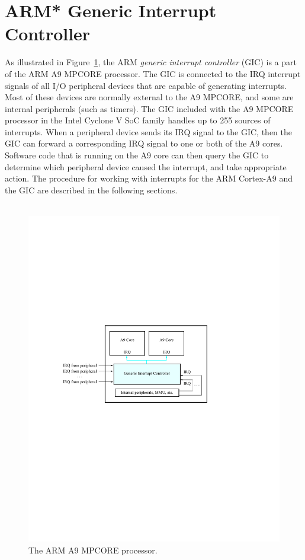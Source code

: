 \documentclass[11pt, twoside, pdftex]{article}
\begin{document}
\section{ARM* Generic Interrupt Controller}
As illustrated in Figure~\ref{fig:arm_MPCORE}, 
the ARM {\it generic interrupt controller} (GIC) is a part of the
ARM A9 MPCORE processor.  The GIC is connected to the IRQ interrupt signals of
all I/O peripheral devices that are capable of generating interrupts.  Most of these
devices are normally external to the A9 MPCORE, and some are internal peripherals (such as
timers). The GIC included
with the A9 MPCORE processor in the Intel Cyclone V SoC family handles up to 255 
sources of interrupts. When a peripheral device sends its IRQ signal to the GIC, then the
GIC can forward a corresponding IRQ signal to one or both of the A9 cores.
Software code that is running on the A9 core can then query the GIC to determine which 
peripheral device caused the interrupt, and take appropriate action. The procedure for 
working with interrupts for the ARM Cortex-A9 and the GIC are described in the following sections.
~\\
~\\
\begin{figure}[h!]
   \begin{center}
		 \includegraphics{figures/ARM_A9_GIC.pdf}
   \end{center}
   \caption{The ARM A9 MPCORE processor.}
	\label{fig:arm_MPCORE}
\end{figure}
\end{document}
